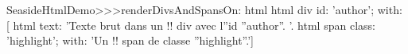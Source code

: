 \begin{code}{}
SeasideHtmlDemo>>>renderDivsAndSpansOn: html 
	html div
		id: 'author';
		with: [
			html text: 'Texte brut dans un !! div avec l''id ''author''. '.
			html span
				class: 'highlight';
				with: 'Un !! span de classe ''highlight''.']
\end{code}
